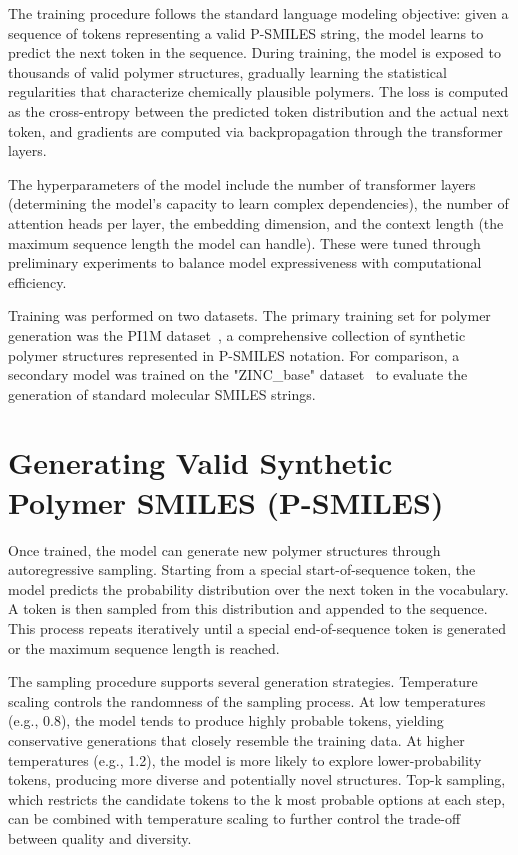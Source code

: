 The training procedure follows the standard language modeling objective: given a sequence of tokens representing a valid P-SMILES string, the model learns to predict the next token in the sequence. During training, the model is exposed to thousands of valid polymer structures, gradually learning the statistical regularities that characterize chemically plausible polymers. The loss is computed as the cross-entropy between the predicted token distribution and the actual next token, and gradients are computed via backpropagation through the transformer layers.

The hyperparameters of the model include the number of transformer layers (determining the model's capacity to learn complex dependencies), the number of attention heads per layer, the embedding dimension, and the context length (the maximum sequence length the model can handle). These were tuned through preliminary experiments to balance model expressiveness with computational efficiency.

Training was performed on two datasets. The primary training set for polymer generation was the PI1M dataset~\cite{pi1m}, a comprehensive collection of synthetic polymer structures represented in P-SMILES notation. For comparison, a secondary model was trained on the "ZINC\_base" dataset~\cite{zinc15, lim2018cvae} to evaluate the generation of standard molecular SMILES strings.

\section{Generating Valid Synthetic Polymer SMILES (P-SMILES)}
\label{sec:generating_psmiles}

Once trained, the model can generate new polymer structures through autoregressive sampling. Starting from a special start-of-sequence token, the model predicts the probability distribution over the next token in the vocabulary. A token is then sampled from this distribution and appended to the sequence. This process repeats iteratively until a special end-of-sequence token is generated or the maximum sequence length is reached.

The sampling procedure supports several generation strategies. Temperature scaling controls the randomness of the sampling process. At low temperatures (e.g., 0.8), the model tends to produce highly probable tokens, yielding conservative generations that closely resemble the training data. At higher temperatures (e.g., 1.2), the model is more likely to explore lower-probability tokens, producing more diverse and potentially novel structures. Top-k sampling, which restricts the candidate tokens to the k most probable options at each step, can be combined with temperature scaling to further control the trade-off between quality and diversity.

